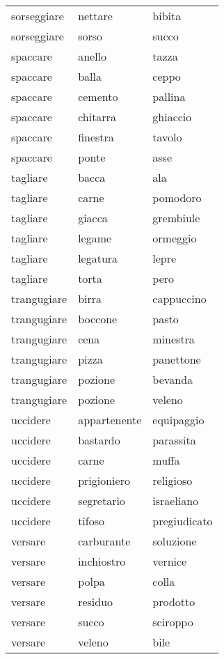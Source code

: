 \begin{longtable}{l|ll}
sorseggiare    & nettare       & bibita       \\
sorseggiare    & sorso         & succo        \\
spaccare       & anello        & tazza        \\
spaccare       & balla         & ceppo        \\
spaccare       & cemento       & pallina      \\
spaccare       & chitarra      & ghiaccio     \\
spaccare       & finestra      & tavolo       \\
spaccare       & ponte         & asse         \\
tagliare       & bacca         & ala          \\
tagliare       & carne         & pomodoro     \\
tagliare       & giacca        & grembiule    \\
tagliare       & legame        & ormeggio     \\
tagliare       & legatura      & lepre        \\
tagliare       & torta         & pero         \\
trangugiare    & birra         & cappuccino   \\
trangugiare    & boccone       & pasto        \\
trangugiare    & cena          & minestra     \\
trangugiare    & pizza         & panettone    \\
trangugiare    & pozione       & bevanda      \\
trangugiare    & pozione       & veleno       \\
uccidere       & appartenente  & equipaggio   \\
uccidere       & bastardo      & parassita    \\
uccidere       & carne         & muffa        \\
uccidere       & prigioniero   & religioso    \\
uccidere       & segretario    & israeliano   \\
uccidere       & tifoso        & pregiudicato \\
versare        & carburante    & soluzione    \\
versare        & inchiostro    & vernice      \\
versare        & polpa         & colla        \\
versare        & residuo       & prodotto     \\
versare        & succo         & sciroppo     \\
versare        & veleno        & bile        
\end{longtable}